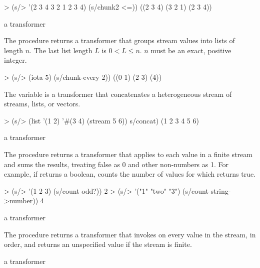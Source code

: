 \codebegin
> (s/> '(2 3 4 3 2 1 2 3 4) (s/chunk2 <=))
((2 3 4) (3 2 1) (2 3 4))
\codeend

\begin{procedure}
\end{procedure}
\returns{} a transformer

The  procedure returns a transformer that groups stream values into
lists of length $n$. The last list length $L$ is $0 < L \le n$. $n$ must be an exact,
positive integer.

\codebegin
> (s/> (iota 5) (s/chunk-every 2))
((0 1) (2 3) (4))
\codeend

\begin{variable}
\end{variable}
\antipar

The  variable is a transformer that concatenates a heterogeneous stream of
streams, lists, or vectors.

\codebegin
> (s/> (list '(1 2) '#(3 4) (stream 5 6)) s/concat)
(1 2 3 4 5 6)
\codeend

\begin{procedure}
\end{procedure}
\returns{} a transformer

The  procedure returns a transformer that applies  to each
value in a finite stream and sums the results, treating false as 0 and other non-numbers
as 1. For example, if  returns a boolean,  counts the number
of values for which  returns true.

\codebegin
> (s/> '(1 2 3) (s/count odd?))
2
> (s/> '("1" "two" "3") (s/count string->number))
4
\codeend

\begin{procedure}
\end{procedure}
\returns{} a transformer

The  procedure returns a transformer that invokes  on every
value in the stream, in order, and returns an unspecified value if the stream is finite.

\begin{procedure}
\end{procedure}
\returns{} a transformer

